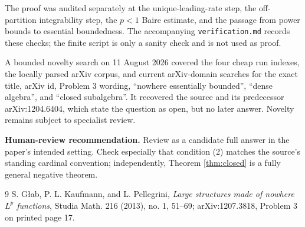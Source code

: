 \documentclass[11pt]{article}
\begin{document}
The proof was audited separately at the unique-leading-rate step, the
off-partition integrability step, the $p<1$ Baire estimate, and the passage
from power bounds to essential boundedness.  The accompanying
\texttt{verification.md} records these checks; the finite script is only a
sanity check and is not used as proof.

A bounded novelty search on 11 August 2026 covered the four cheap run indexes,
the locally parsed arXiv corpus, and current arXiv-domain searches for the
exact title, arXiv id, Problem 3 wording, ``nowhere essentially bounded'',
``dense algebra'', and ``closed subalgebra''.  It recovered the source and its
predecessor arXiv:1204.6404, which state the question as open, but no later
answer.  Novelty remains subject to specialist review.

\medskip
\noindent\textbf{Human-review recommendation.} Review as a candidate full
answer in the paper's intended setting.  Check especially that condition (2)
matches the source's standing cardinal convention; independently, Theorem
\ref{thm:closed} is a fully general negative theorem.

\begin{thebibliography}{9}
S. G\l ab, P. L. Kaufmann, and L. Pellegrini,
\emph{Large structures made of nowhere $L^p$ functions},
Studia Math. 216 (2013), no. 1, 51--69; arXiv:1207.3818,
Problem 3 on printed page 17.
\end{thebibliography}
\end{document}
